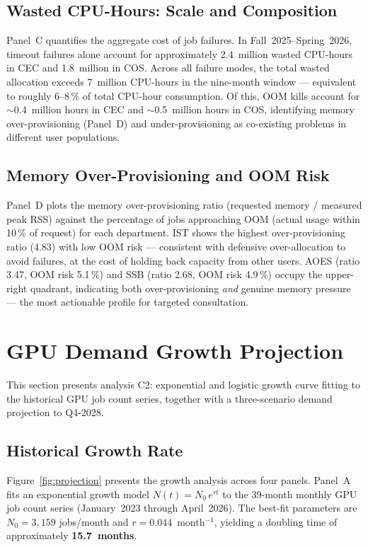 \documentclass[11pt,letterpaper]{article}
\begin{document}
\subsection{Wasted CPU-Hours: Scale and Composition}

Panel~C quantifies the aggregate cost of job failures.  In Fall~2025--Spring~2026,
timeout failures alone account for approximately 2.4~million wasted CPU-hours in
CEC and 1.8~million in COS.  Across all failure modes, the total wasted allocation
exceeds 7~million CPU-hours in the nine-month window --- equivalent to roughly
6--8\,\% of total CPU-hour consumption.  Of this, OOM kills account for
$\sim$0.4~million hours in CEC and $\sim$0.5~million hours in COS, identifying
memory over-provisioning (Panel~D) and under-provisioning as co-existing problems
in different user populations.

\subsection{Memory Over-Provisioning and OOM Risk}

Panel~D plots the memory over-provisioning ratio (requested memory / measured
peak RSS) against the percentage of jobs approaching OOM (actual usage within
10\,\% of request) for each department.  IST shows the highest over-provisioning
ratio (4.83) with low OOM risk --- consistent with defensive over-allocation to
avoid failures, at the cost of holding back capacity from other users.  AOES
(ratio 3.47, OOM risk 5.1\,\%) and SSB (ratio 2.68, OOM risk 4.9\,\%) occupy
the upper-right quadrant, indicating both over-provisioning \emph{and} genuine
memory pressure --- the most actionable profile for targeted consultation.

\section{GPU Demand Growth Projection}
\label{sec:projection}

This section presents analysis C2: exponential and logistic growth curve fitting
to the historical GPU job count series, together with a three-scenario demand
projection to Q4-2028.

\subsection{Historical Growth Rate}

Figure~\ref{fig:projection} presents the growth analysis across four panels.
Panel~A fits an exponential growth model
$N(t) = N_0 \, e^{rt}$
to the 39-month monthly GPU job count series (January~2023 through April~2026).
The best-fit parameters are $N_0 = 3{,}159$ jobs/month and
$r = 0.044$~month$^{-1}$, yielding a doubling time of approximately
\textbf{15.7~months}.
\end{document}
